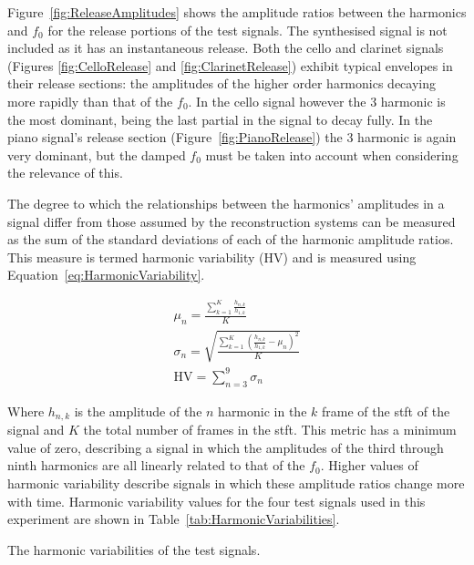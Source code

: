 		Figure~\ref{fig:ReleaseAmplitudes} shows the amplitude ratios between the harmonics and $f_{0}$ for the
		release portions of the test signals. The synthesised signal is not included as it has an instantaneous
		release. Both the cello and clarinet signals (Figures \ref{fig:CelloRelease} and \ref{fig:ClarinetRelease})
		exhibit typical envelopes in their release sections: the amplitudes of the higher order harmonics decaying
		more rapidly than that of the $f_{0}$. In the cello signal however the 3 harmonic is the most
		dominant, being the last partial in the signal to decay fully. In the piano signal's release section
		(Figure~\ref{fig:PianoRelease}) the 3 harmonic is again very dominant, but the damped $f_{0}$
		must be taken into account when considering the relevance of this.

		The degree to which the relationships between the harmonics' amplitudes in a signal differ from those
		assumed by the reconstruction systems can be measured as the sum of the standard deviations of each of the
		harmonic amplitude ratios. This measure is termed harmonic variability ($\mathrm{HV}$) and is measured
		using Equation~\ref{eq:HarmonicVariability}. 		
		
		\begin{gather}
			\mu_{n} = \frac{\sum_{k = 1}^{K} \frac{h_{n,k}}{h_{1,k}}}{K} \nonumber \\
			\sigma_{n} = \sqrt{\frac{\sum_{k = 1}^{K} 
					         \left(\frac{h_{n,k}}{h_{1,k}} - \mu_{n} \right)^{2}}{K}} \nonumber \\
			\mathrm{HV} = \sum_{n = 3}^{9} \sigma_{n}
			\label{eq:HarmonicVariability}
		\end{gather}

		Where $h_{n,k}$ is the amplitude of the $n$ harmonic in the $k$ frame of the
		\acrshort{stft} of the signal and $K$ the total number of frames in the \acrshort{stft}. This metric has a
		minimum value of zero, describing a signal in which the amplitudes of the third through ninth harmonics are
		all linearly related to that of the $f_{0}$. Higher values of harmonic variability describe signals in
		which these amplitude ratios change more with time. Harmonic variability values for the four test signals
		used in this experiment are shown in Table~\ref{tab:HarmonicVariabilities}.

		\begin{table}[h!]
			\centering
			
			\caption{The harmonic variabilities of the test signals.}
			\label{tab:HarmonicVariabilities}
		\end{table}

